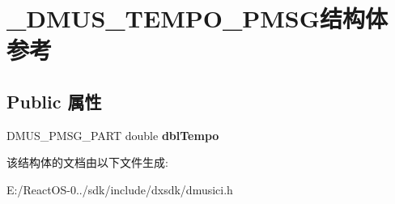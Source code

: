 \hypertarget{struct___d_m_u_s___t_e_m_p_o___p_m_s_g}{}\section{\+\_\+\+D\+M\+U\+S\+\_\+\+T\+E\+M\+P\+O\+\_\+\+P\+M\+S\+G结构体 参考}
\label{struct___d_m_u_s___t_e_m_p_o___p_m_s_g}
\subsection*{Public 属性}
\begin{DoxyCompactItemize}
\item 
\mbox{\label{struct___d_m_u_s___t_e_m_p_o___p_m_s_g_a0d1a4c73e192bcd3677f0368bdce9403}} 
D\+M\+U\+S\+\_\+\+P\+M\+S\+G\+\_\+\+P\+A\+RT double {\bfseries dbl\+Tempo}
\end{DoxyCompactItemize}


该结构体的文档由以下文件生成\+:\begin{DoxyCompactItemize}
\item 
E\+:/\+React\+O\+S-\/0../sdk/include/dxsdk/dmusici.\+h\end{DoxyCompactItemize}
